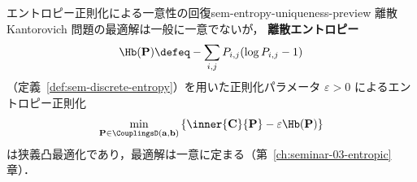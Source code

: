 \begin{remark}{エントロピー正則化による一意性の回復}{sem-entropy-uniqueness-preview}
  離散 Kantorovich 問題の最適解は一般に一意でないが，
  \textbf{離散エントロピー}
  \[
    \Hb(\mathbf{P}) \defeq -\sum_{i,j} P_{i,j}(\log P_{i,j} - 1)
  \]
  （定義~\ref{def:sem-discrete-entropy}）を用いた正則化パラメータ $\varepsilon > 0$
  によるエントロピー正則化
  \[
    \min_{\mathbf{P} \in \CouplingsD(\mathbf{a}, \mathbf{b})}
    \left\{
      \inner{\mathbf{C}}{\mathbf{P}}
      - \varepsilon \Hb(\mathbf{P})
    \right\}
  \]
  は狭義凸最適化であり，最適解は一意に定まる（第~\ref{ch:seminar-03-entropic}章）．
\end{remark}


